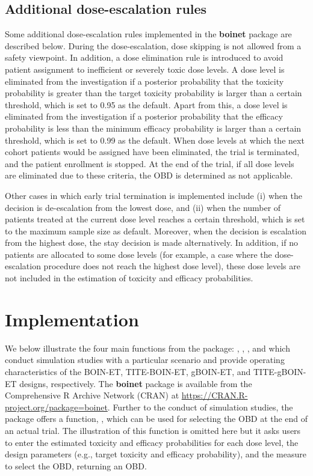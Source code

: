 \subsection{Additional dose-escalation rules}
Some additional dose-escalation rules implemented in the \textbf{boinet} package are described below. During the dose-escalation, dose skipping is not allowed from a safety viewpoint. In addition, a dose elimination rule is introduced to avoid patient assignment to inefficient or severely toxic dose levels. A dose level is eliminated from the investigation if a posterior probability that the toxicity probability is greater than the target toxicity probability is larger than a certain threshold, which is set to 0.95 as the default. Apart from this, a dose level is eliminated from the investigation if a posterior probability that the efficacy probability is less than the minimum efficacy probability is larger than a certain threshold, which is set to 0.99 as the default. When dose levels at which the next cohort patients would be assigned have been eliminated, the trial is terminated, and the patient enrollment is stopped. At the end of the trial, if all dose levels are eliminated due to these criteria, the OBD is determined as not applicable.

Other cases in which early trial termination is implemented include (i) when the decision is de-escalation from the lowest dose, and (ii) when the number of patients treated at the current dose level reaches a certain threshold, which is set to the maximum sample size as default. Moreover, when the decision is escalation from the highest dose, the stay decision is made alternatively. In addition, if no patients are allocated to some dose levels (for example, a case where the dose-escalation procedure does not reach the highest dose level), these dose levels are not included in the estimation of toxicity and efficacy probabilities.

\section{Implementation}
We below illustrate the four main functions from the  package: , , , and  which conduct simulation studies with a particular scenario and provide operating characteristics of the BOIN-ET, TITE-BOIN-ET, gBOIN-ET, and TITE-gBOIN-ET designs, respectively. The \textbf{boinet} package is available from the Comprehensive R Archive Network (CRAN) at \href{https://CRAN.R-project.org/package=boinet}{https://CRAN.R-project.org/package=boinet}. Further to the conduct of simulation studies, the package offers a function, , which can be used for selecting the OBD at the end of an actual trial. The illustration of this function is omitted here but it asks users to enter the estimated toxicity and efficacy probabilities for each dose level, the design parameters (e.g., target toxicity and efficacy probability), and the measure to select the OBD, returning an OBD.

